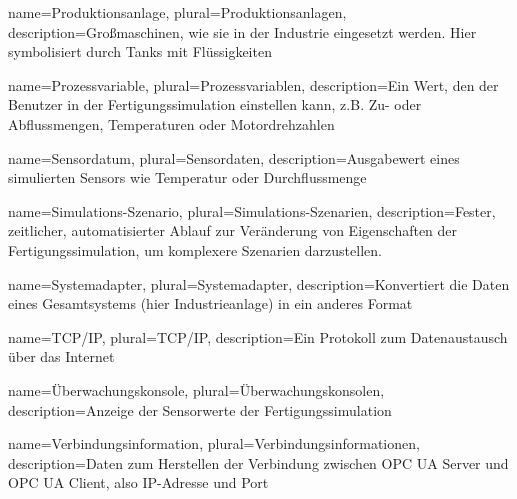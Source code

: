{
  name=Produktionsanlage,
  plural=Produktionsanlagen,
  description={Großmaschinen, wie sie in der Industrie eingesetzt werden. Hier symbolisiert durch Tanks mit Flüssigkeiten}
}

{
  name=Prozessvariable,
  plural=Prozessvariablen,
  description={Ein Wert, den der Benutzer in der \gls{Fertigungssimulation} einstellen kann, z.B. Zu- oder Abflussmengen, Temperaturen oder Motordrehzahlen}
}

{
  name=Sensordatum,
  plural=Sensordaten,
  description={Ausgabewert eines simulierten Sensors wie Temperatur oder Durchflussmenge}
}

{
  name=Simulations-Szenario,
  plural=Simulations-Szenarien,
  description={Fester, zeitlicher, automatisierter Ablauf zur Veränderung von Eigenschaften der \gls{Fertigungssimulation}, um komplexere Szenarien darzustellen.}
}

{
  name=Systemadapter,
  plural=Systemadapter,
  description={Konvertiert die Daten eines Gesamtsystems (hier Industrieanlage) in ein anderes Format}
}

{
  name=TCP/IP,
  plural=TCP/IP,
  description={Ein Protokoll zum Datenaustausch über das Internet}
}

{
  name=Überwachungskonsole,
  plural=Überwachungskonsolen,
  description={Anzeige der Sensorwerte der Fertigungssimulation}
}

{
  name=Verbindungsinformation,
  plural=Verbindungsinformationen,
  description={Daten zum Herstellen der Verbindung zwischen \gls{OPC UA Server} und \gls{OPC UA Client}, also \gls{IP-Adresse} und Port}
}